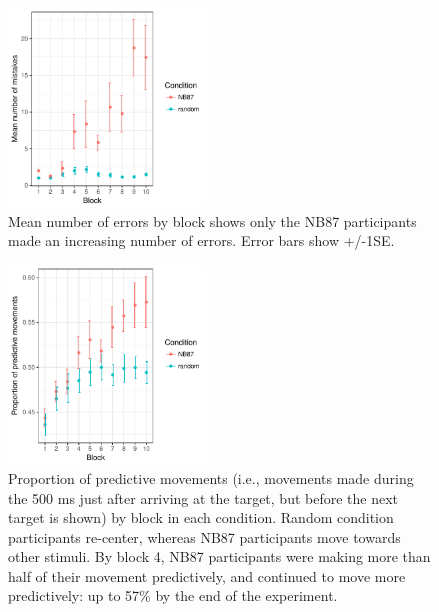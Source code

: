 \documentclass[man,floatsintext]{apa6}
\begin{document}
\begin{figure}[!h]
  \centering
  \includegraphics[width=0.47\textwidth]{figures/exp1_training_mistakes_per_block}
  \caption{Mean number of errors by block shows only the NB87 participants made an increasing number of errors. Error bars show +/-1SE.}
  \label{fig:fail-block}
\end{figure} 

\begin{figure}[!h]
  \centering
  \includegraphics[width=0.47\textwidth]{figures/exp1_predictive_moves_vs_block}
  \caption{\small{Proportion of predictive movements (i.e., movements made during the 500 ms just after arriving at the target, but before the next target is shown) by block in each condition. Random condition participants re-center, whereas NB87 participants move towards other stimuli. By block 4, NB87 participants were making more than half of their movement predictively, and continued to move more predictively: up to 57\% by the end of the experiment.}}
  \label{fig:predict}
\end{figure} 
\end{document}
